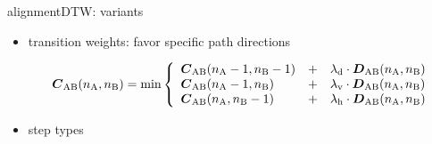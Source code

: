         \begin{frame}{alignment}{DTW: variants}
            \begin{itemize}
                \item	transition weights: favor specific path directions
                    \begin{footnotesize}
                        \begin{equation*}
                            \mat{C}_{\mathrm{AB}}(n_\mathrm{A},n_\mathrm{B}) = \min\left\{
                                                    \begin{array}{lll} 
                                                    \mat{C}_{\mathrm{AB}}(n_\mathrm{A}-1,n_\mathrm{B}-1)	&+& \lambda_\mathrm{d}\cdot\mat{D}_{\mathrm{AB}}(n_\mathrm{A},n_\mathrm{B})\\
                                                    \mat{C}_{\mathrm{AB}}(n_\mathrm{A}-1,n_\mathrm{B}) 	&+& \lambda_\mathrm{v}\cdot\mat{D}_{\mathrm{AB}}(n_\mathrm{A},n_\mathrm{B})\\
                                                    \mat{C}_{\mathrm{AB}}(n_\mathrm{A},n_\mathrm{B}-1) 	&+& \lambda_\mathrm{h}\cdot\mat{D}_{\mathrm{AB}}(n_\mathrm{A},n_\mathrm{B})
                                                    \end{array} 
                                                    \right.\nonumber
                        \end{equation*}
                    \end{footnotesize}
                \item<2->	step types
                \begin{figure}
                    
                \end{figure}
                
            \end{itemize}
        \end{frame}
